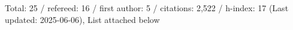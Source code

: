 Total: 25 / refereed: 16 / first author: 5 / citations: 2,522 / h-index: 17 (Last updated: 2025-06-06), List attached below
